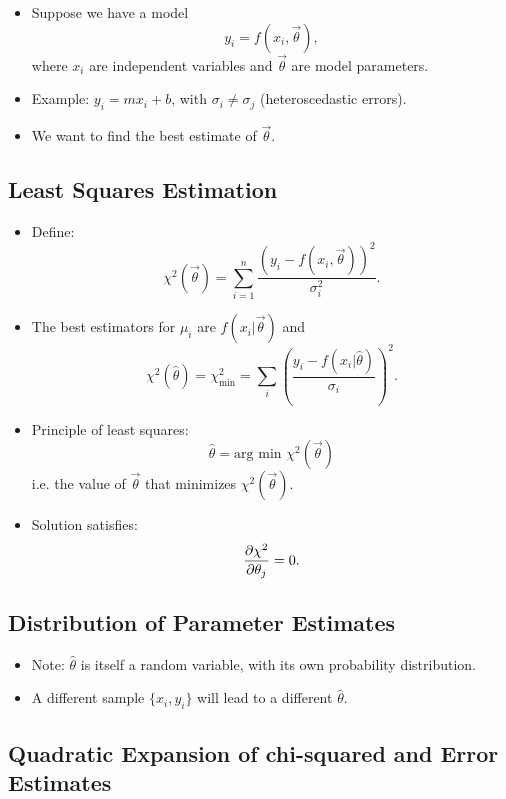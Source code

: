 \begin{itemize}
    \item Suppose we have a model
          \[
              y_i = f(x_i, \vec{\theta}),
          \]
          where $x_i$ are independent variables and $\vec{\theta}$ are model parameters.
    \item Example: $y_i = m x_i + b$, with $\sigma_i \neq \sigma_j$ (heteroscedastic errors).
    \item We want to find the best estimate of $\vec{\theta}$.
\end{itemize}

\subsection{Least Squares Estimation}

\begin{itemize}
    \item Define:
          \[
              \chi^2(\vec{\theta}) = \sum_{i=1}^{n} \frac{(y_i - f(x_i, \vec{\theta}))^2}{\sigma_i^2} .
          \]
    \item The best estimators for $\mu_i$ are $f(x_i|\vec{\theta})$ and
          \[
              \chi^2(\hat{\theta}) = \chi^2_{\text{min}} = \sum_i \left( \frac{y_i - f(x_i|\hat{\theta})}{\sigma_i} \right)^2 .
          \]
    \item Principle of least squares:
          \[
              \hat{\theta} = \text{arg min } \chi^2(\vec{\theta})
          \]
          i.e. the value of $\vec{\theta}$ that minimizes $\chi^2(\vec{\theta})$.
    \item Solution satisfies:
          \[
              \pdv{\chi^2}{\theta_j} = 0 .
          \]
\end{itemize}

\subsection{Distribution of Parameter Estimates}

\begin{itemize}
    \item Note: $\hat{\theta}$ is itself a random variable, with its own probability distribution.
    \item A different sample $\{x_i, y_i\}$ will lead to a different $\hat{\theta}$.
\end{itemize}

\subsection{Quadratic Expansion of chi-squared and Error Estimates}


